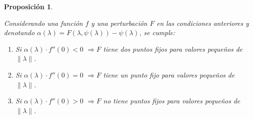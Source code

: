 \documentclass[12pt,a4paper]{report}
\newtheorem{proposicion}{Proposición}[section]
\theoremstyle{definition}
\begin{document}
\begin{proposicion}\label{Prop3}

Considerando una función $f$ y una perturbación $F$ en las condiciones anteriores y denotando $\alpha(\lambda) = F(\lambda,\psi(\lambda)) - \psi(\lambda)$, se cumple:

\begin{enumerate} 

\item Si $\alpha(\lambda) \cdot f''(0) < 0 $ $\Rightarrow  F$ tiene dos puntos fijos para valores pequeños de $\|\lambda\|$.

\item Si $\alpha(\lambda) \cdot f''(0) = 0 $ $\Rightarrow  F$ tiene un punto fijo para valores pequeños de $\|\lambda\|$.

\item Si $\alpha(\lambda) \cdot f''(0) > 0 $ $\Rightarrow  F$ no tiene puntos fijos para valores pequeños de $\|\lambda\|$.

\end{enumerate}
\end{proposicion}
\end{document}
